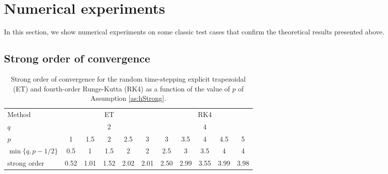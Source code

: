 \documentclass{siamart1116}
\numberwithin{theorem}{section}
\begin{document}
\section{Numerical experiments}\label{sec:NumericalExperiments}

In this section, we show numerical experiments on some classic test cases that confirm the theoretical results presented above. 

\subsection{Strong order of convergence}

\begin{table}[!t]
	\centering
	\begin{tabular}{lcccccccccc}
		\toprule
		Method & \multicolumn{5}{c}{ET} & \multicolumn{5}{c}{RK4} \\ 
		\cmidrule(l{2pt}r{2pt}){2-6} \cmidrule(l{2pt}r{2pt}){7-11} 
		$q$ & \multicolumn{5}{c}{2} & \multicolumn{5}{c}{4} \\
		$p$ & 1 & 1.5 & 2 & 2.5 & 3 & 3 & 3.5 & 4 & 4.5 & 5\\
		$\min\{q, p - 1/2\}$ & 0.5 & 1 & 1.5 & 2 & 2 & 2.5 & 3 & 3.5 & 4 & 4 \\
		strong order & 0.52 & 1.01 & 1.52 & 2.02 & 2.01 & 2.50 & 2.99 & 3.55 & 3.99 & 3.98 \\
		\bottomrule
	\end{tabular}
	\caption{Strong order of convergence for the random time-stepping explicit trapezoidal (ET) and fourth-order Runge-Kutta (RK4) as a function of the value of $p$ of Assumption \ref{as:hStrong}.}
	\label{tab:NumericalResultsStrongOrder}
\end{table}
\end{document}
